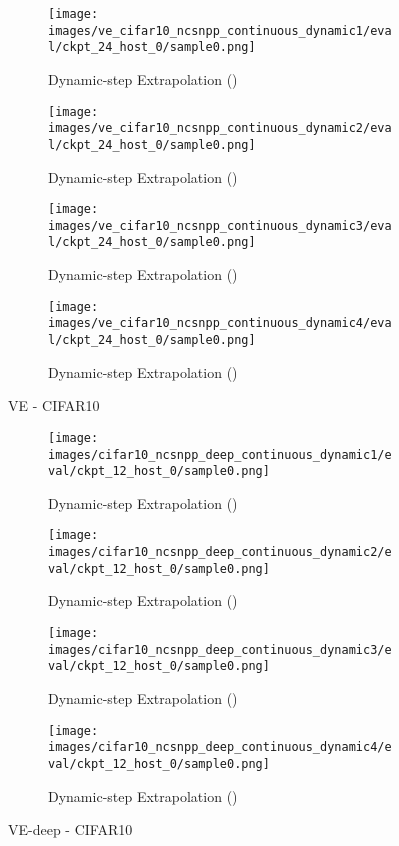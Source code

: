 \documentclass{article}
\begin{document}
\begin{figure}[ht] 
\begin{subfigure}[b]{0.5\linewidth}
    \centering
    \texttt{[image: images/ve\_cifar10\_ncsnpp\_continuous\_dynamic1/eval/ckpt\_24\_host\_0/sample0.png]} 
    \caption{Dynamic-step Extrapolation ()} 
  \end{subfigure}
  \begin{subfigure}[b]{0.5\linewidth}
    \centering
    \texttt{[image: images/ve\_cifar10\_ncsnpp\_continuous\_dynamic2/eval/ckpt\_24\_host\_0/sample0.png]}
    \caption{Dynamic-step Extrapolation ()} 
  \end{subfigure}
  \begin{subfigure}[b]{0.5\linewidth}
    \centering
    \texttt{[image: images/ve\_cifar10\_ncsnpp\_continuous\_dynamic3/eval/ckpt\_24\_host\_0/sample0.png]} 
    \caption{Dynamic-step Extrapolation ()} 
  \end{subfigure}
  \begin{subfigure}[b]{0.5\linewidth}
    \centering
    \texttt{[image: images/ve\_cifar10\_ncsnpp\_continuous\_dynamic4/eval/ckpt\_24\_host\_0/sample0.png]}
    \caption{Dynamic-step Extrapolation ()} 
  \end{subfigure}
  \caption{VE - CIFAR10}
  \label{fig13} 
\end{figure}


\begin{figure}[ht] 
  \begin{subfigure}[b]{0.5\linewidth}
    \centering
    \texttt{[image: images/cifar10\_ncsnpp\_deep\_continuous\_dynamic1/eval/ckpt\_12\_host\_0/sample0.png]} 
    \caption{Dynamic-step Extrapolation ()} 
  \end{subfigure}
  \begin{subfigure}[b]{0.5\linewidth}
    \centering
    \texttt{[image: images/cifar10\_ncsnpp\_deep\_continuous\_dynamic2/eval/ckpt\_12\_host\_0/sample0.png]}
    \caption{Dynamic-step Extrapolation ()} 
  \end{subfigure}
  \begin{subfigure}[b]{0.5\linewidth}
    \centering
    \texttt{[image: images/cifar10\_ncsnpp\_deep\_continuous\_dynamic3/eval/ckpt\_12\_host\_0/sample0.png]} 
    \caption{Dynamic-step Extrapolation ()} 
  \end{subfigure}
  \begin{subfigure}[b]{0.5\linewidth}
    \centering
    \texttt{[image: images/cifar10\_ncsnpp\_deep\_continuous\_dynamic4/eval/ckpt\_12\_host\_0/sample0.png]}
    \caption{Dynamic-step Extrapolation ()} 
  \end{subfigure}
  \caption{VE-deep - CIFAR10}
  \label{fig14} 
\end{figure}
\end{document}
